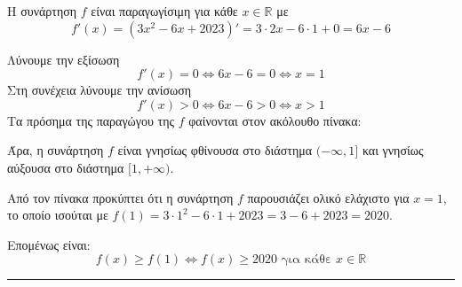 \begin{alist}
\item Η συνάρτηση $f$ είναι παραγωγίσιμη για κάθε $x \in \mathbb{R}$ με
\[ f'(x) = (3x^2 - 6x + 2023)' = 3 \cdot 2x - 6 \cdot 1 + 0 = 6x - 6 \]

\item Λύνουμε την εξίσωση
\[ f'(x) = 0 \Leftrightarrow 6x - 6 = 0 \Leftrightarrow x = 1 \]
Στη συνέχεια λύνουμε την ανίσωση
\[ f'(x) > 0 \Leftrightarrow 6x - 6 > 0 \Leftrightarrow x > 1 \]
Τα πρόσημα της παραγώγου της $f$ φαίνονται στον ακόλουθο πίνακα:

\begin{center}
\end{center}

Άρα, η συνάρτηση $f$ είναι γνησίως φθίνουσα στο διάστημα $(-\infty, 1]$ και γνησίως αύξουσα στο διάστημα $[1, +\infty)$.

\item Από τον πίνακα προκύπτει ότι η συνάρτηση $f$ παρουσιάζει ολικό ελάχιστο για $x = 1$, το οποίο ισούται με $f(1) = 3 \cdot 1^2 - 6 \cdot 1 + 2023 = 3 - 6 + 2023 = 2020$.

Επομένως είναι:
\[ f(x) \ge f(1) \Leftrightarrow f(x) \ge 2020 \text{ για κάθε } x \in \mathbb{R} \]
\end{alist}
\vspace{6mm}
\noindent\rule{\textwidth}{0.4pt}
\vspace{6mm}

